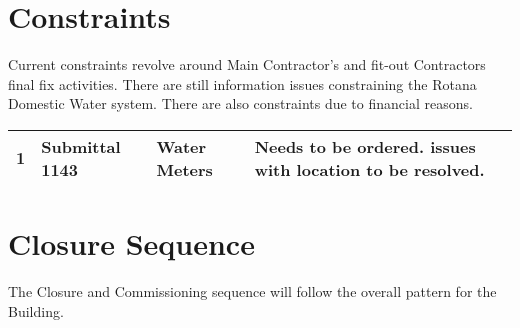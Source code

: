 \section{Constraints}
Current constraints revolve around Main Contractor's and fit-out Contractors final fix activities. There are still information issues constraining the Rotana Domestic Water system. There are also constraints due to financial reasons.


\begin{tabular}{lllp{3.5cm}}
\toprule
1  &Submittal 1143   &Water Meters & Needs to be ordered. issues with location to be resolved.\\
\midrule
\bottomrule
\end{tabular}

%

\section{Closure Sequence}

The Closure and Commissioning sequence will follow the overall pattern for the Building. 
\bigskip



